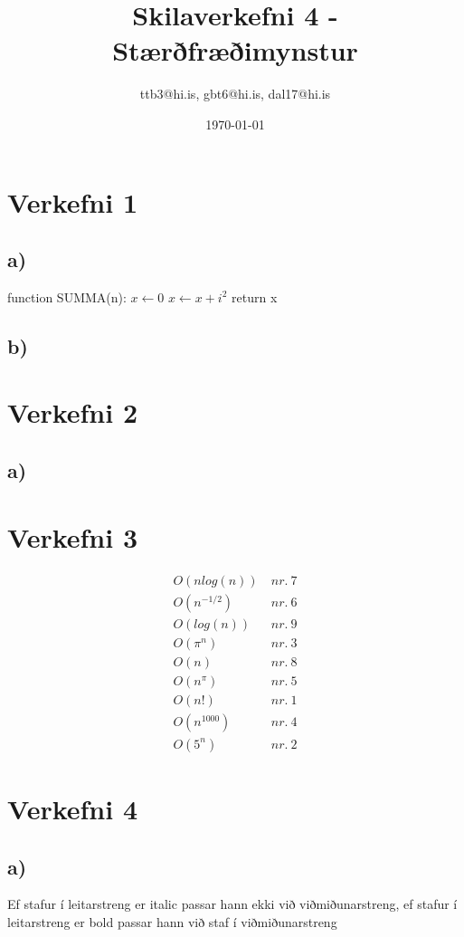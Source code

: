 \documentclass{article}
\title{Skilaverkefni 4 - Stærðfræðimynstur}
\author{ttb3@hi.is, gbt6@hi.is, dal17@hi.is}
\date{\today}
\begin{document}
\maketitle

\section*{Verkefni 1}
\subsection*{a)}

\begin{algorithmic}
\State function SUMMA(n):
\State $x \gets 0$
    \State $x \gets x + i^2$
\EndFor
\State return x
\end{algorithmic}

\subsection*{b)}

\section*{Verkefni 2}
\subsection*{a)}

\section*{Verkefni 3}
\begin{align*}
   O(nlog(n))\ &nr.\ 7\\
   O(n^{-1/2})\ &nr.\ 6\\
   O(log(n))\ &nr.\ 9\\
   O(\pi^n)\ &nr.\ 3\\
   O(n)\ &nr.\ 8\\
   O(n^\pi)&nr.\ 5\\
   O(n!)\ &nr.\ 1\\
   O(n^{1000})\ &nr.\ 4\\
   O(5^n)\ &nr.\ 2
\end{align*}

\section*{Verkefni 4}
\subsection*{a)}
Ef stafur í leitarstreng er italic passar hann ekki við viðmiðunarstreng, ef stafur í leitarstreng er bold passar hann við staf í viðmiðunarstreng
\end{document}
